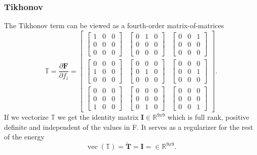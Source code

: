 \subsubsection{Tikhonov}
The Tikhonov term can be viewed as a fourth-order matrix-of-matrices
\[
\mathbb{T} = \frac{\partial \mathbf{F}}{\partial f_i} = \left[\begin{array}{ccc}{\begin{bmatrix} 1 & 0 & 0 \\ 0 & 0 & 0 \\ 0 & 0 & 0 \end{bmatrix}} & {\begin{bmatrix} 0 & 1 & 0 \\ 0 & 0 & 0 \\ 0 & 0 & 0 \end{bmatrix}} & {\begin{bmatrix} 0 & 0 & 1 \\ 0 & 0 & 0 \\ 0 & 0 & 0 \end{bmatrix}} \\ {\begin{bmatrix} 0 & 0 & 0 \\ 1 & 0 & 0 \\ 0 & 0 & 0 \end{bmatrix}} & {\begin{bmatrix} 0 & 0 & 0 \\ 0 & 1 & 0 \\ 0 & 0 & 0 \end{bmatrix}} & {\begin{bmatrix} 0 & 0 & 0 \\ 0 & 0 & 1 \\ 0 & 0 & 0 \end{bmatrix}} \\ {\begin{bmatrix} 0 & 0 & 0 \\ 0 & 0 & 0 \\ 1 & 0 & 0 \end{bmatrix}} & {\begin{bmatrix} 0 & 0 & 0 \\ 0 & 0 & 0 \\ 0 & 1 & 0 \end{bmatrix}} & {\begin{bmatrix} 0 & 0 & 0 \\ 0 & 0 & 0 \\ 0 & 0 & 1 \end{bmatrix}} \end{array}\right].
\]
If we vectorize $\mathbb{T}$ we get the identity matrix $\mathbf{I} \in \mathbb{R}^{9x9}$ which is full rank, positive definite and independent of the values in F. It serves as a regularizer for the rest of the energy
\[
\operatorname{vec}(\mathbb{T}) =  \mathbf{\check{T}} = \mathbf{I} = \in \mathbb{R}^{9x9}.
\]

